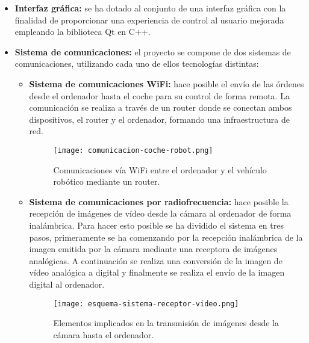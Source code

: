 \begin{itemize}
\item \textbf{Interfaz gráfica:} se ha dotado al conjunto de una interfaz gráfica con la finalidad de proporcionar una experiencia de control al usuario mejorada empleando la biblioteca Qt en C++.

\item \textbf{Sistema de comunicaciones:} el proyecto se compone de dos sistemas de comunicaciones, utilizando cada uno de ellos tecnologías distintas:

\begin{itemize}
\item \textbf{Sistema de comunicaciones WiFi:} hace posible el envío de las órdenes desde el ordenador hasta el coche para su control de forma remota. La comunicación se realiza a través de un router donde se conectan ambos dispositivos, el router y el ordenador, formando una infraestructura de red.

\begin{figure}[H]
  \begin{center}
    \texttt{[image: comunicacion-coche-robot.png]}
  \end{center}
  \caption{Comunicaciones vía WiFi entre el ordenador y el vehículo robótico mediante un router.}
  \label{fig:com-coche-pc}
\end{figure}

\item  \textbf{Sistema de comunicaciones por radiofrecuencia:} hace posible la recepción de imágenes de vídeo desde la cámara al ordenador de forma inalámbrica. Para hacer esto posible se ha dividido el sistema en tres pasos, primeramente se ha comenzando por la recepción inalámbrica de la imagen emitida por la cámara mediante una receptora de imágenes analógicas. A continuación se realiza una conversión de la imagen de vídeo analógica a digital y finalmente se realiza el envío de la imagen digital al ordenador.

\begin{figure}[H]
  \begin{center}
    \texttt{[image: esquema-sistema-receptor-video.png]}
  \end{center}
  \caption{Elementos implicados en la transmisión de imágenes desde la cámara hasta el ordenador.}
  \label{fig:com-camara-pc}
\end{figure}

\end{itemize}

 
\end{itemize}

